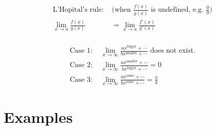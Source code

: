 \documentclass{article}
\begin{document}
\noindent\begin{align*}
	\text{L'Hopital's rule: }&\text{(when $\frac{f(x)}{g(x)}$ is undefined, e.g. $\frac{0}{0}$)} \\
	\lim_{x \to a} \frac{f(x)}{g(x)} &= \lim_{x \to a} \frac{f'(x)}{g'(x)} \\
\end{align*}

\begin{align*}
	\text{Case 1: }&\lim_{x \to \infty} \frac{ax^{\text{bigger}}+\cdots}{bx^{\text{smaller}}+\cdots}\text{ does not exist.} \\
	\text{Case 2: }&\lim_{x \to \infty} \frac{ax^{\text{smaller}}+\cdots}{bx^{\text{bigger}}+\cdots} = 0 \\
	\text{Case 3: }&\lim_{x \to \infty} \frac{ax^{\text{same}}+\cdots}{bx^{\text{same}}+\cdots} = \frac{a}{b}
\end{align*}



\newpage

\section*{Examples}
\end{document}
